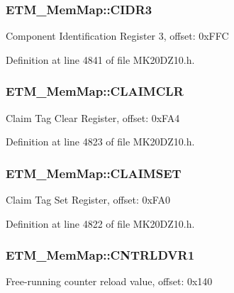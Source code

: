 \subsubsection[{\texorpdfstring{C\+I\+D\+R3}{CIDR3}}]{ E\+T\+M\+\_\+\+Mem\+Map\+::\+C\+I\+D\+R3}\hypertarget{struct_e_t_m___mem_map_a9c6bb1acae3c766482e230468863dcd6}{}\label{struct_e_t_m___mem_map_a9c6bb1acae3c766482e230468863dcd6}
Component Identification Register 3, offset\+: 0x\+F\+FC 

Definition at line 4841 of file M\+K20\+D\+Z10.\+h.

\subsubsection[{\texorpdfstring{C\+L\+A\+I\+M\+C\+LR}{CLAIMCLR}}]{ E\+T\+M\+\_\+\+Mem\+Map\+::\+C\+L\+A\+I\+M\+C\+LR}\hypertarget{struct_e_t_m___mem_map_a7e03dd9e31abcfe824f7b81b3cd4207f}{}\label{struct_e_t_m___mem_map_a7e03dd9e31abcfe824f7b81b3cd4207f}
Claim Tag Clear Register, offset\+: 0x\+F\+A4 

Definition at line 4823 of file M\+K20\+D\+Z10.\+h.

\subsubsection[{\texorpdfstring{C\+L\+A\+I\+M\+S\+ET}{CLAIMSET}}]{ E\+T\+M\+\_\+\+Mem\+Map\+::\+C\+L\+A\+I\+M\+S\+ET}\hypertarget{struct_e_t_m___mem_map_a410e895c96250842d992c62e914062ab}{}\label{struct_e_t_m___mem_map_a410e895c96250842d992c62e914062ab}
Claim Tag Set Register, offset\+: 0x\+F\+A0 

Definition at line 4822 of file M\+K20\+D\+Z10.\+h.

\subsubsection[{\texorpdfstring{C\+N\+T\+R\+L\+D\+V\+R1}{CNTRLDVR1}}]{ E\+T\+M\+\_\+\+Mem\+Map\+::\+C\+N\+T\+R\+L\+D\+V\+R1}\hypertarget{struct_e_t_m___mem_map_aa83f53db92961a712ee31a8b810f0fad}{}\label{struct_e_t_m___mem_map_aa83f53db92961a712ee31a8b810f0fad}
Free-\/running counter reload value, offset\+: 0x140 

